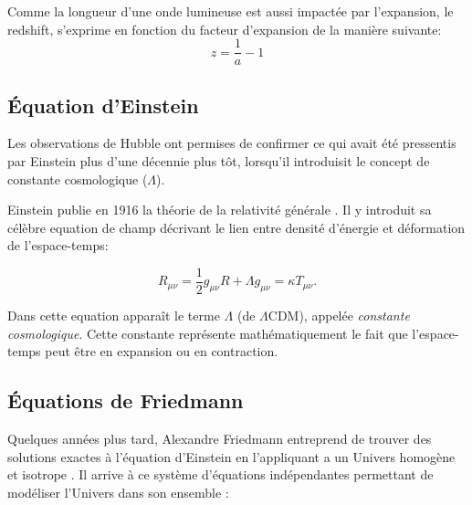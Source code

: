 Comme la longueur d'une onde lumineuse est aussi impactée par l'expansion, le redshift, s'exprime en fonction du facteur d'expansion de la manière suivante:
\begin{equation}
z= \frac{1}{a}-1
\end{equation}

\subsection{Équation d'Einstein}

Les observations de Hubble ont permises de confirmer ce qui avait été pressentis par Einstein plus d'une décennie plus tôt, lorsqu'il introduisit le concept de constante cosmologique ($\Lambda$). 

Einstein publie en 1916 la théorie de la relativité générale \citep{1916AnP...354..769E}.
Il y introduit sa célèbre equation de champ décrivant le lien entre densité d'énergie et déformation de l'espace-temps:

\begin{equation}
R_{\mu\nu} = \frac{1}{2} g_{\mu\nu}R + \Lambda g_{\mu\nu}  = \kappa T_{\mu\nu}.
\label{eq:einstein}
\end{equation} 

Dans cette equation apparaît le terme $\Lambda$ (de $\Lambda$CDM), appelée \textit{constante cosmologique}.
Cette constante représente mathématiquement le fait que l'espace-temps peut être en expansion ou en contraction.

\subsection{Équations de Friedmann}
\label{sec:friedman}

Quelques années plus tard, Alexandre Friedmann entreprend de trouver des solutions exactes à l'équation d'Einstein en l'appliquant a un Univers homogène et isotrope \citep{1922ZPhy...10..377F}.
Il arrive à ce système d'équations indépendantes permettant de modéliser l'Univers dans son ensemble :

% 
%
% 
 
